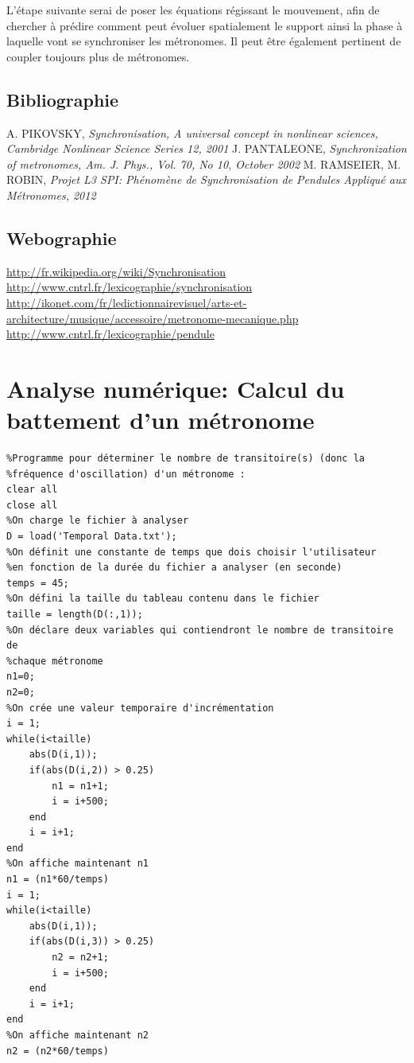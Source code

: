 \documentclass[a4paper,11pt]{report}
\begin{document}
L'étape suivante serai de poser les équations régissant le mouvement, afin de chercher à prédire comment peut évoluer spatialement le support ainsi la phase à laquelle vont se synchroniser les métronomes. Il peut être également pertinent de coupler toujours plus de métronomes.
\renewcommand{\bibname}{Références}
\begin{thebibliography}{2}
\section*{Bibliographie}
 A. PIKOVSKY, {\it Synchronisation, A universal concept in nonlinear sciences, Cambridge Nonlinear Science Series 12, 2001}
 J. PANTALEONE, {\it Synchronization of metronomes, Am. J. Phys., Vol. 70, No 10, October 2002}
 M. RAMSEIER, M. ROBIN, {\it Projet L3 SPI: Phénomène de Synchronisation de Pendules Appliqué aux Métronomes, 2012}
\section*{Webographie}
 \url{http://fr.wikipedia.org/wiki/Synchronisation}
 \url{http://www.cntrl.fr/lexicographie/synchronisation}
 \url{http://ikonet.com/fr/ledictionnairevisuel/arts-et-architecture/musique/accessoire/metronome-mecanique.php}
 \url{http://www.cntrl.fr/lexicographie/pendule}
\end{thebibliography}
\appendix
\chapter{Analyse numérique: Calcul du battement d'un métronome}
\label{Battements}
\begin{verbatim}
%Programme pour déterminer le nombre de transitoire(s) (donc la 
%fréquence d'oscillation) d'un métronome :
clear all
close all
%On charge le fichier à analyser
D = load('Temporal Data.txt');
%On définit une constante de temps que dois choisir l'utilisateur 
%en fonction de la durée du fichier a analyser (en seconde)
temps = 45;
%On défini la taille du tableau contenu dans le fichier
taille = length(D(:,1));
%On déclare deux variables qui contiendront le nombre de transitoire de
%chaque métronome
n1=0;
n2=0;
%On crée une valeur temporaire d'incrémentation
i = 1;
while(i<taille)
    abs(D(i,1));
    if(abs(D(i,2)) > 0.25)
        n1 = n1+1;
        i = i+500;
    end
    i = i+1;
end
%On affiche maintenant n1
n1 = (n1*60/temps)
i = 1;
while(i<taille)
    abs(D(i,1));
    if(abs(D(i,3)) > 0.25)
        n2 = n2+1;
        i = i+500;
    end
    i = i+1;
end
%On affiche maintenant n2
n2 = (n2*60/temps)
\end{verbatim}
\end{document}
